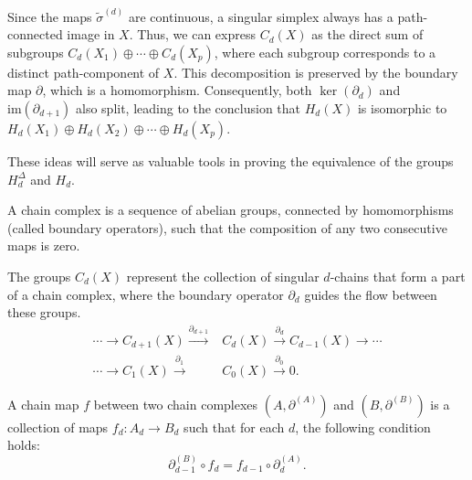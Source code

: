 Since the maps $\tilde{\sigma}^{(d)}$ are continuous, a singular simplex always
has a path-connected image in $X$. Thus, we can express $C_{d}(X)$ as the direct
sum of subgroups $C_{d}(X_{1}) \oplus \cdots \oplus C_{d}(X_{p})$, where each subgroup
corresponds to a distinct path-component of $X$. This decomposition is preserved
by the boundary map $\partial$, which is a homomorphism. Consequently, both $\ker
(\partial_{d})$ and $\mathrm{im}(\partial_{d+1})$ also split, leading to the
conclusion that $H_{d}(X)$ is isomorphic to
$H_{d}(X_{1}) \oplus H_{d}(X_{2}) \oplus \cdots \oplus H_{d}(X_{p})$.

These ideas will serve as valuable tools in proving the equivalence of the
groups $H_{d}^{\Delta}$ and $H_{d}$.

\begin{definition}
	A chain complex is a sequence of abelian groups, connected by homomorphisms (called
	boundary operators), such that the composition of
	any two consecutive maps is zero.
\end{definition}

\begin{example}
	The groups $C_{d}(X)$ represent the collection of singular $d$-chains that form
	a part of a chain complex, where the boundary operator $\partial_{d}$ guides
	the flow between these groups.
	\begin{align}
		\cdots \xrightarrow{}C_{d+1}(X) \xrightarrow{\partial_{d+1}} & C_{d}(X) \xrightarrow{\partial_d}C_{d-1}(X) \xrightarrow{}\cdots \\
		\cdots \xrightarrow{}C_{1}(X) \xrightarrow{\partial_1}       & C_{0}(X) \xrightarrow{\partial_0}0.
	\end{align}
\end{example}

\begin{definition}
	A chain map $f$ between two chain complexes $(A, \partial^{(A)})$ and $(B,\partial
	^{(B)})$ is a collection of maps $f_{d}: A_{d} \rightarrow B_{d}$ such that for
	each $d$, the following condition holds:
	\begin{equation}
		\partial^{(B)}_{d-1}\circ f_{d} = f_{d-1}\circ \partial^{(A)}_{d}.
	\end{equation}
\end{definition}

